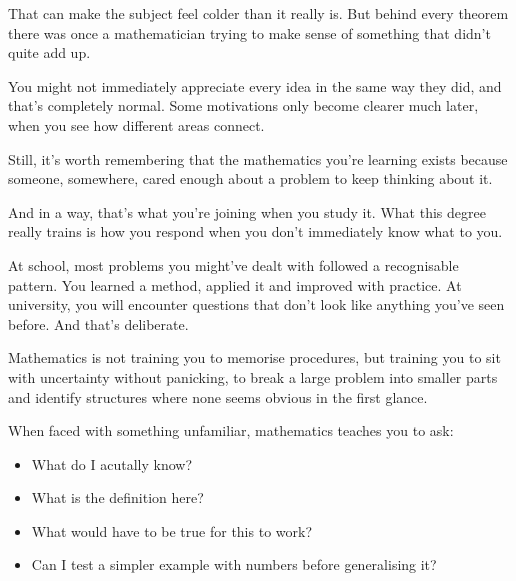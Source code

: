 That can make the subject feel colder than it really is. But behind every theorem there was once a mathematician trying to make sense of something that didn’t quite add up.

You might not immediately appreciate every idea in the same way they did, and that’s completely normal. Some motivations only become clearer much later, when you see how different areas connect.

Still, it’s worth remembering that the mathematics you’re learning exists because someone, somewhere, cared enough about a problem to keep thinking about it.

And in a way, that’s what you’re joining when you study it. What this degree really trains is how you respond when you don't immediately know what to you. 

At school, most problems you might've dealt with followed a recognisable pattern. You learned a method, applied it and improved with practice. At university, you will encounter questions that don't look like anything you've seen before. And that's deliberate. 

Mathematics is not training you to memorise procedures, but training you to sit with uncertainty without panicking, to break a large problem into smaller parts and identify structures where none seems obvious in the first glance. 



When faced with something unfamiliar, mathematics teaches you to ask: 
\begin{itemize}
    \item What do I acutally know? 
    \item What is the definition here? 
    \item What would have to be true for this to work? 
    \item Can I test a simpler example with numbers before generalising it? 
\end{itemize}

